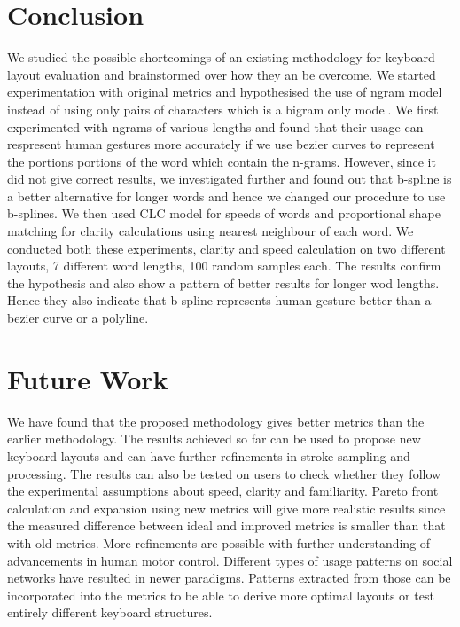 \documentclass[MTech]{iitmdiss}
\begin{document}
\chapter{Conclusion}
We studied the possible shortcomings of an existing methodology for keyboard layout evaluation and brainstormed over how they an be overcome. We started experimentation with original metrics and hypothesised the use of ngram model instead of using only pairs of characters which is a bigram only model. We first experimented with ngrams of various lengths and found that their usage can respresent human gestures more accurately if we use bezier curves to represent the portions portions of the word which contain the n-grams. However, since it did not give correct results, we investigated further and found out that b-spline is a better alternative for longer words and hence we changed our procedure to use b-splines. We then used CLC model for speeds of words and proportional shape matching for clarity calculations using nearest neighbour of each word. We conducted both these experiments, clarity and speed calculation on two different layouts, 7 different word lengths, 100 random samples each. The results confirm the hypothesis and also show a pattern of better results for longer wod lengths. Hence they also indicate that b-spline represents human gesture better than a bezier curve or a polyline.

\chapter{Future Work}
We have found that the proposed methodology gives better metrics than the earlier methodology. The results achieved so far can be used to propose new keyboard layouts and can have further refinements in stroke sampling and processing. The results can also be tested on users to check whether they follow the experimental assumptions about speed, clarity and familiarity. Pareto front calculation and expansion using new metrics will give more realistic results since the measured difference between ideal and improved metrics is smaller than that with old metrics. More refinements are possible with further understanding of advancements in human motor control.
Different types of usage patterns on social networks have resulted in newer paradigms. Patterns extracted from those can be incorporated into the metrics to be able to derive more optimal layouts or test entirely different keyboard structures.


\begin{singlespace}
%	
	
\end{singlespace}
\end{document}
